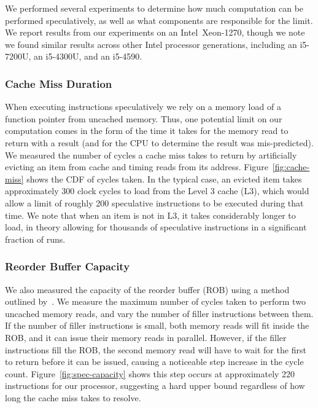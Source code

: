 We performed several experiments to determine how much computation can be
performed
speculatively, as well as what components are responsible for the limit.
We report results from our experiments on an Intel~Xeon-1270,
though we note we found similar results across other Intel processor generations,
including an i5-7200U, %
an i5-4300U, %
and an i5-4590. %



\subsubsection{Cache Miss Duration}
When executing instructions speculatively we rely on a memory load of a function
pointer from uncached memory. Thus, one potential limit on our computation comes
in the form of the time it takes for the memory read to return with a result
(and for the CPU to determine the result was mis-predicted).
We measured the number of cycles a
cache miss takes to return by artificially evicting an item from cache and
timing reads from its address.
Figure~\ref{fig:cache-miss} shows the CDF of cycles taken. In the typical case,
an evicted item takes approximately 300 clock cycles to load from the Level 3 cache (L3), which
would allow a limit of roughly 200 speculative instructions to be
executed during that time. We note that when an item is not in L3, it takes
considerably longer to load, in theory allowing for thousands of speculative
instructions in a significant fraction of runs.


\subsubsection{Reorder Buffer Capacity} \label{sssec:ROB}
We also measured the capacity of the reorder buffer (ROB) using a method
outlined by~\cite{measuring-rob}. We measure the maximum number of cycles taken
to perform two uncached memory reads, and vary the number of filler instructions
between them. If the number of filler instructions is small, both memory reads
will fit inside the ROB, and it can issue their memory reads in parallel.
However, if the filler instructions fill the ROB, the second memory read will
have to wait for the first to return before it can be issued, causing a
noticeable step increase in the cycle count. Figure~\ref{fig:spec-capacity}
shows this step occurs at approximately 220 instructions for our processor,
suggesting a hard upper bound regardless of how long the cache miss takes to
resolve.

